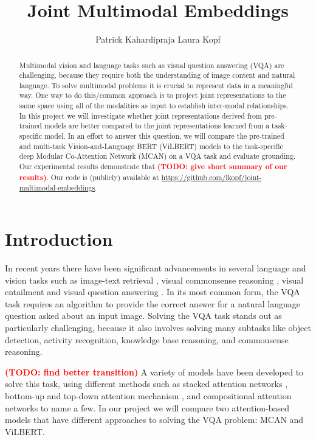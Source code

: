 \documentclass{article}
\title{Joint Multimodal Embeddings} %
\author{%
   Patrick Kahardipraja%
  \And
   Laura Kopf \\
}
\newcommand{\todo}[1]{\textbf{\textcolor{Red}{(TODO: #1)}}}
\begin{document}
\maketitle

\begin{abstract}
Multimodal vision and language tasks such as visual question answering (VQA) are challenging, because they require both the understanding of image content and natural language. To solve multimodal problems it is crucial to represent data in a meaningful way. One way to do this/common approach is to project joint representations to the same space using all of the modalities as input to establish inter-modal relationships. In this project we will investigate whether joint representations derived from pre-trained models are better compared to the joint representations learned from a task-specific model. In an effort to answer this question, we will compare the pre-trained and multi-task Vision-and-Language BERT (ViLBERT) \citep{lu2019vilbert, lu2020multitask} models to the task-specific deep Modular Co-Attention Network (MCAN) \citep{yu2019mcan} on a VQA task and evaluate grounding. Our experimental results demonstrate that \todo{give short summary of our results}. Our code is (publicly) available at \url{https://github.com/lkopf/joint-multimodal-embeddings}.
\end{abstract}

\section{Introduction}

In recent years there have been significant advancements in several language and vision tasks such as image-text retrieval \citep{wang2016retrieval}, visual commonsense reasoning \citep{zellers2019vcr}, visual entailment \citep{xie2019entailment} and visual question answering \citep{antol2015vqa, malinowski2014vqa, ban, zhao2018vqa}. In its most common form, the VQA task requires an algorithm to provide the correct answer for a natural language question asked about an input image. Solving the VQA task stands out as particularly challenging, because it also involves solving many subtasks like object detection, activity recognition, knowledge base reasoning, and commonsense reasoning. 

\todo{find better transition}
A variety of models have been developed to solve this task, using different methods such as stacked attention networks \citep{yang2016vqa}, bottom-up and top-down attention mechanism \citep{Anderson_2018_CVPR}, and compositional attention networks \citep{hudson2018mac} to name a few. In our project we will compare two attention-based models that have different approaches to solving the VQA problem: MCAN and ViLBERT.
\end{document}
